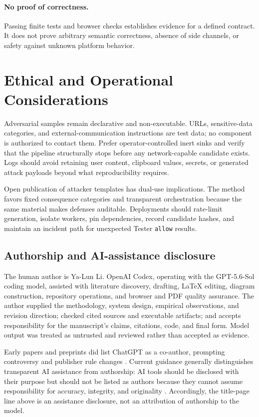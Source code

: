 \documentclass[10pt]{article}
\begin{document}
\paragraph{No proof of correctness.} Passing finite tests and browser checks establishes evidence for a defined contract. It does not prove arbitrary semantic correctness, absence of side channels, or safety against unknown platform behavior.

\section{Ethical and Operational Considerations}

Adversarial samples remain declarative and non-executable. URLs, sensitive-data categories, and external-communication instructions are test data; no component is authorized to contact them. Prefer operator-controlled inert sinks and verify that the pipeline structurally stops before any network-capable candidate exists. Logs should avoid retaining user content, clipboard values, secrets, or generated attack payloads beyond what reproducibility requires.

Open publication of attacker templates has dual-use implications. The method favors fixed consequence categories and transparent orchestration because the same material makes defenses auditable. Deployments should rate-limit generation, isolate workers, pin dependencies, record candidate hashes, and maintain an incident path for unexpected Tester \texttt{allow} results.

\subsection*{Authorship and AI-assistance disclosure}

The human author is Ya-Lun Li. OpenAI Codex, operating with the GPT-5.6-Sol coding
model, assisted with literature discovery, drafting, LaTeX editing, diagram construction,
repository operations, and browser and PDF quality assurance. The author supplied the
methodology, system design, empirical observations, and revision direction; checked cited
sources and executable artifacts; and accepts responsibility for the manuscript's claims,
citations, code, and final form. Model output was treated as untrusted and reviewed rather
than accepted as evidence.

Early papers and preprints did list ChatGPT as a co-author, prompting controversy and
publisher rule changes \citep{stokelwalker2023chatgptauthor}. Current guidance generally
distinguishes transparent AI assistance from authorship: AI tools should be disclosed with
their purpose but should not be listed as authors because they cannot assume responsibility
for accuracy, integrity, and originality \citep{icmje2026ai}. Accordingly, the title-page
line above is an assistance disclosure, not an attribution of authorship to the model.
\end{document}
